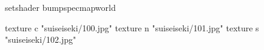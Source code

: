setshader bumpspecmapworld

    texture c "suiseiseki/100.jpg"
    texture n "suiseiseki/101.jpg"
    texture s "suiseiseki/102.jpg"
